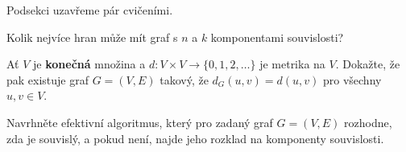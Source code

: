 Podsekci uzavřeme pár cvičeními.

\begin{exercise}[těžké]
 Kolik nejvíce hran může mít graf s $n$ a $k$ komponentami souvislosti?
\end{exercise}

\begin{exercise}
 Ať $V$ je \textbf{konečná} množina a $d:V \times V \to \{0,1,2,\ldots\}$ je
 metrika na $V$. Dokažte, že pak existuje graf $G = (V,E)$ takový, že $d_G(u,v)
 = d(u,v)$ pro všechny $u,v \in V$.
\end{exercise}

\begin{exercise}
 Navrhněte efektivní algoritmus, který pro zadaný graf $G = (V,E)$ rozhodne, zda
 je souvislý, a pokud není, najde jeho rozklad na komponenty souvislosti.
\end{exercise}
